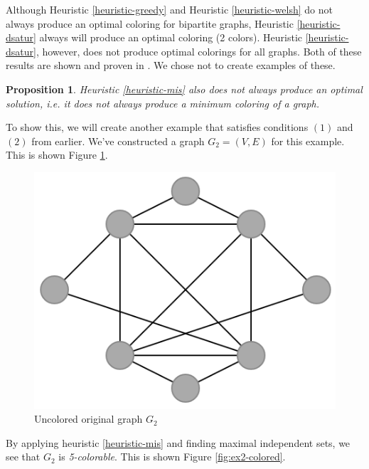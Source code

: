 \documentclass{article}
\newcounter{heuristic} \setcounter{heuristic}{0}
\newtheorem{prop}{Proposition}
\theoremstyle{definition}
\begin{document}
Although Heuristic \ref{heuristic-greedy} and Heuristic \ref{heuristic-welsh} do not always produce an optimal coloring for bipartite graphs, Heuristic \ref{heuristic-dsatur} always will produce an optimal coloring (2 colors). Heuristic \ref{heuristic-dsatur}, however, does not produce optimal colorings for all graphs. Both of these results are shown and proven in \cite{brelaz}. We chose not to create examples of these.

\begin{prop}
Heuristic \ref{heuristic-mis} also does not always produce an optimal solution, i.e. it does not always produce a minimum coloring of a graph.
\end{prop}

To show this, we will create another example that satisfies conditions \((1)\) and \((2)\) from earlier. We've constructed a graph \(G_2 = (V,E)\) for this example. This is shown Figure \ref{fig:ex2-uncolored}.

\begin{figure}[H]
\centering
\includegraphics[scale=0.5]{images/mis-1.png}
\caption{Uncolored original graph \(G_2\)}\label{fig:ex2-uncolored}
\end{figure}

By applying heuristic \ref{heuristic-mis} and finding maximal independent sets, we see that \(G_2\) is \emph{5-colorable}. This is shown Figure \ref{fig:ex2-colored}.
\end{document}
